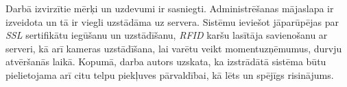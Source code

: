 Darbā izvirzītie mērķi un uzdevumi ir sasniegti. Administrēšanas mājaslapa ir izveidota un tā ir viegli uzstādāma uz servera. Sistēmu ieviešot jāparūpējas par \textit{SSL} sertifikātu iegūšanu un uzstādīšanu, \textit{RFID} karšu lasītāja savienošanu ar serveri, kā arī kameras uzstādīšana, lai varētu veikt momentuzņēmumus, durvju atvēršanās laikā.
Kopumā, darba autors uzskata, ka izstrādātā sistēma būtu pielietojama arī citu telpu piekļuves pārvaldībai, kā lēts un spējīgs risinājums.